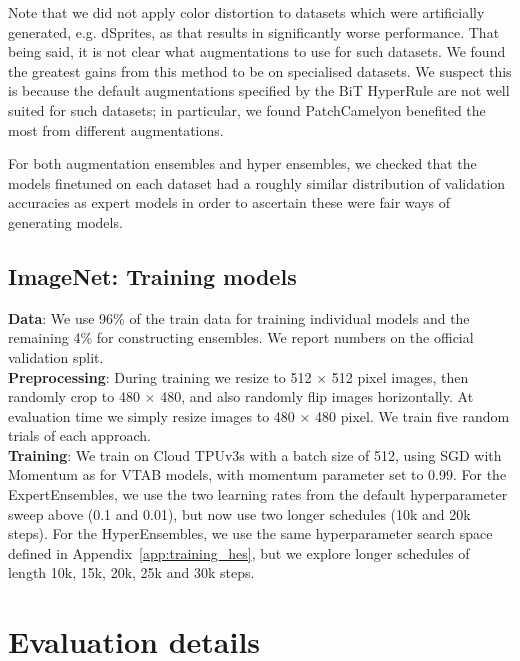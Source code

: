 \documentclass{article} \usepackage{iclr2021_conference,times}
\begin{document}
Note that we did not apply color distortion to datasets which were artificially generated, e.g. dSprites, as that results in significantly worse performance. That being said, it is not clear what augmentations to use for such datasets. We found the greatest gains from this method to be on specialised datasets. We suspect this is because the default augmentations specified by the BiT HyperRule are not well suited for such datasets; in particular, we found PatchCamelyon benefited the most from different augmentations.

For both augmentation ensembles and hyper ensembles, we checked that the models finetuned on each dataset had a roughly similar distribution of validation accuracies as expert models in order to ascertain these were fair ways of generating models.

\subsection{ImageNet: Training models}
\label{app:imagenet_training}
\textbf{Data}: We use 96\% of the train data for training individual models and the remaining 4\% for constructing ensembles. We report numbers on the official validation split.\\

\textbf{Preprocessing}:  During training we resize to 512 $\times$ 512 pixel images, then randomly crop to 480 $\times$ 480, and also randomly flip images horizontally. At evaluation time we simply resize images to 480 $\times$ 480 pixel. We train five random trials of each approach.\\

\textbf{Training}: We train on Cloud TPUv3s with a batch size of 512, using SGD with Momentum as for VTAB models, with momentum parameter set to 0.99. For the ExpertEnsembles, we use the two learning rates from the default hyperparameter sweep above (0.1 and 0.01), but now use two longer schedules (10k and 20k steps). For the HyperEnsembles, we use the same hyperparameter search space defined in Appendix~\ref{app:training_hes}, but we explore longer schedules of length 10k, 15k, 20k, 25k and 30k steps.

 \section{Evaluation details}
\end{document}
